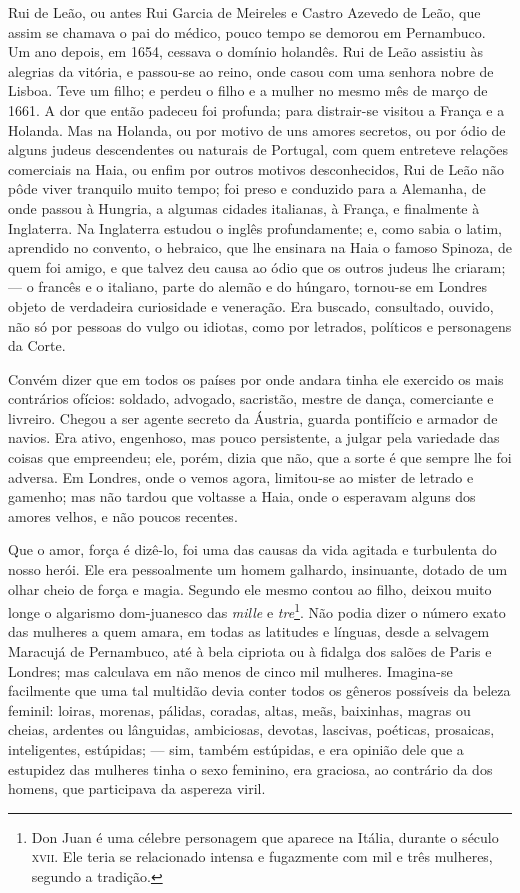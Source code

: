 Rui de Leão, ou antes Rui Garcia de Meireles e Castro Azevedo de Leão,
que assim se chamava o pai do médico, pouco tempo se demorou em
Pernambuco. Um ano depois, em 1654, cessava o domínio holandês. Rui de
Leão assistiu às alegrias da vitória, e passou-se ao reino, onde casou
com uma senhora nobre de Lisboa. Teve um filho; e perdeu o filho e a
mulher no mesmo mês de março de 1661. A dor que então padeceu foi
profunda; para distrair-se visitou a França e a Holanda. Mas na Holanda,
ou por motivo de uns amores secretos, ou por ódio de alguns judeus
descendentes ou naturais de Portugal, com quem entreteve relações
comerciais na Haia, ou enfim por outros motivos desconhecidos, Rui de
Leão não pôde viver tranquilo muito tempo; foi preso e conduzido para a
Alemanha, de onde passou à Hungria, a algumas cidades italianas, à
França, e finalmente à Inglaterra. Na Inglaterra estudou o inglês
profundamente; e, como sabia o latim, aprendido no convento, o hebraico,
que lhe ensinara na Haia o famoso Spinoza, de quem foi amigo, e que
talvez deu causa ao ódio que os outros judeus lhe criaram; --- o francês
e o italiano, parte do alemão e do húngaro, tornou-se em Londres objeto
de verdadeira curiosidade e veneração. Era buscado, consultado, ouvido,
não só por pessoas do vulgo ou idiotas, como por letrados, políticos e
personagens da Corte.

Convém dizer que em todos os países por onde andara tinha ele exercido
os mais contrários ofícios: soldado, advogado, sacristão, mestre de
dança, comerciante e livreiro. Chegou a ser agente secreto da Áustria,
guarda pontifício e armador de navios. Era ativo, engenhoso, mas pouco
persistente, a julgar pela variedade das coisas que empreendeu; ele,
porém, dizia que não, que a sorte é que sempre lhe foi adversa. Em
Londres, onde o vemos agora, limitou-se ao mister de letrado e gamenho;
mas não tardou que voltasse a Haia, onde o esperavam alguns dos amores
velhos, e não poucos recentes.

Que o amor, força é dizê-lo, foi uma das causas da vida agitada e
turbulenta do nosso herói. Ele era pessoalmente um homem galhardo,
insinuante, dotado de um olhar cheio de força e magia. Segundo ele mesmo
contou ao filho, deixou muito longe o algarismo dom-juanesco das
\emph{mille} e \emph{tre}\footnote{Don Juan é uma célebre personagem que
  aparece na Itália, durante o século \textsc{xvii}. Ele teria se relacionado
  intensa e fugazmente com mil e três mulheres, segundo a tradição.}.
Não podia dizer o número exato das mulheres a quem amara, em todas as
latitudes e línguas, desde a selvagem Maracujá de Pernambuco, até à bela
cipriota ou à fidalga dos salões de Paris e Londres; mas calculava em
não menos de cinco mil mulheres. Imagina-se facilmente que uma tal
multidão devia conter todos os gêneros possíveis da beleza feminil:
loiras, morenas, pálidas, coradas, altas, meãs, baixinhas, magras ou
cheias, ardentes ou lânguidas, ambiciosas, devotas, lascivas, poéticas,
prosaicas, inteligentes, estúpidas; --- sim, também estúpidas, e era
opinião dele que a estupidez das mulheres tinha o sexo feminino, era
graciosa, ao contrário da dos homens, que participava da aspereza viril.

